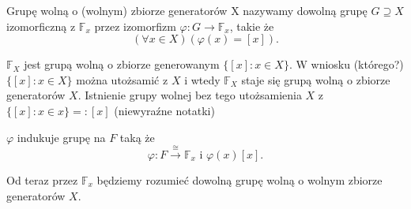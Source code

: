 \begin{definition}
	Grupę wolną o (wolnym) zbiorze generatorów X nazywamy dowolną grupę $G \supseteq X$ izomorficzną z $\mathbb{F}_{x}$ przez izomorfizm $\varphi: G \to \mathbb{F}_{x}$, takie że
	\[
	\left(\forall x \in X \right)\left( \varphi \left( x \right) = \left[ x \right]   \right)  
	.\] 
\end{definition} 
\begin{remark}
	$\mathbb{F} _{X}$ jest grupą wolną o zbiorze generowanym $\{\left[ x \right] : x \in X\} $. W wniosku (którego?) $\{\left[ x \right] : x \in X\} $ można utożsamić z $X$ i wtedy $\mathbb{F}_{X}$ staje się grupą wolną o zbiorze generatorów $X$. Istnienie grupy wolnej bez tego utożsamienia $X$ z $\{\left[ x \right] : x \in x\} =: \left[ x \right] $ (niewyraźne notatki)
\centering
{}

$\varphi  $ indukuje grupę na $F$ taką że
\[
\varphi : F \overset{\cong }{\rightarrow} \mathbb{F} _{x}\text{ i } \varphi \left( x \right) \left[ x \right]   
.\] 
\end{remark} 
\begin{context}

	Od teraz przez $\mathbb{F}_{x}$ będziemy rozumieć dowolną grupę wolną o wolnym zbiorze generatorów $X$.
\end{context}

